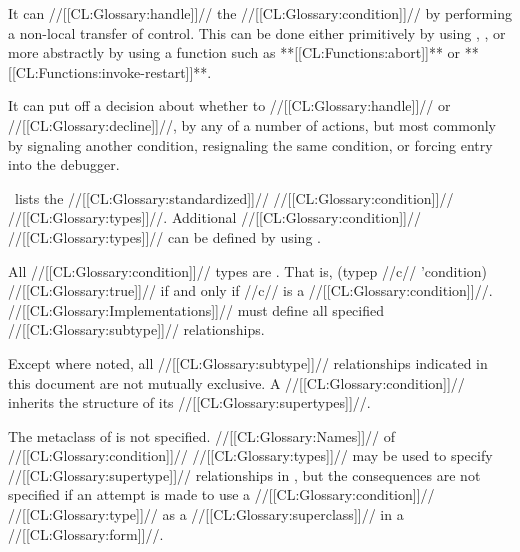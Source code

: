   It can //[[CL:Glossary:handle]]// the //[[CL:Glossary:condition]]// by performing a non-local transfer of control.  This can be done either primitively by using , ,  or more abstractly by using a function such as **[[CL:Functions:abort]]** or **[[CL:Functions:invoke-restart]]**.

  It can put off a decision about whether to //[[CL:Glossary:handle]]// or //[[CL:Glossary:decline]]//, by any of a number of actions, but most commonly by 
    signaling another condition,
    resignaling the same condition,
 or forcing entry into the debugger.

\endlist

  \Thenextfigure\ lists the //[[CL:Glossary:standardized]]// //[[CL:Glossary:condition]]// //[[CL:Glossary:types]]//. Additional //[[CL:Glossary:condition]]// //[[CL:Glossary:types]]// can be defined by using .

        

All //[[CL:Glossary:condition]]// types are .  That is,
  \code
 (typep //c// 'condition) \EV //[[CL:Glossary:true]]// \endcode if and only if //c// is a //[[CL:Glossary:condition]]//.
  //[[CL:Glossary:Implementations]]// must define all specified //[[CL:Glossary:subtype]]// relationships.

Except where noted, all //[[CL:Glossary:subtype]]// relationships indicated in  this document are not mutually exclusive. A //[[CL:Glossary:condition]]// inherits the structure of its //[[CL:Glossary:supertypes]]//.

  The metaclass of  is not specified. //[[CL:Glossary:Names]]// of //[[CL:Glossary:condition]]// //[[CL:Glossary:types]]// may be used to specify //[[CL:Glossary:supertype]]// relationships in ,  but the consequences are not specified if an attempt is made to use a //[[CL:Glossary:condition]]// //[[CL:Glossary:type]]// as a //[[CL:Glossary:superclass]]// in a  //[[CL:Glossary:form]]//.


